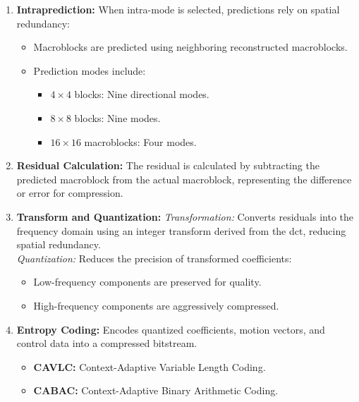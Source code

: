 \begin{enumerate}[label=\textbf{\roman*.}]
        \item \textbf{Intraprediction:}  
        When intra-mode is selected, predictions rely on spatial redundancy:
        \begin{itemize}
            \item Macroblocks are predicted using neighboring reconstructed macroblocks.
            \item Prediction modes include:
            \begin{itemize}
                \item $4 \times 4$ blocks: Nine directional modes.
                \item $8 \times 8$ blocks: Nine modes.
                \item $16 \times 16$ macroblocks: Four modes.
            \end{itemize}
        \end{itemize}
    
        \item \textbf{Residual Calculation:}  
        The residual is calculated by subtracting the predicted macroblock from the actual macroblock, representing the difference or error for compression.
    
        \item \textbf{Transform and Quantization:}  
        \textit{Transformation:} Converts residuals into the frequency domain using an integer transform derived from the \gls{dct}, reducing spatial redundancy. \\
        \textit{Quantization:} Reduces the precision of transformed coefficients:
        \begin{itemize}
            \item Low-frequency components are preserved for quality.
            \item High-frequency components are aggressively compressed.
        \end{itemize}
    
        \item \textbf{Entropy Coding:}  
        Encodes quantized coefficients, motion vectors, and control data into a compressed bitstream.
        \begin{itemize}
            \item \textbf{CAVLC:} Context-Adaptive Variable Length Coding.
            \item \textbf{CABAC:} Context-Adaptive Binary Arithmetic Coding.
        \end{itemize}
    

\end{enumerate}

